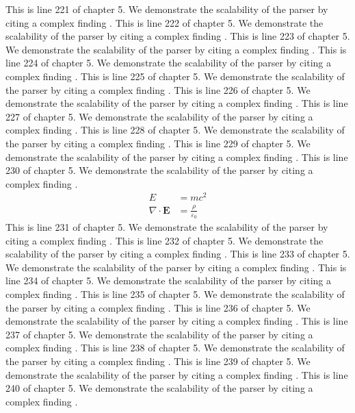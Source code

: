 This is line 221 of chapter 5. We demonstrate the scalability of the parser by citing a complex finding \cite{ref5_221}.
This is line 222 of chapter 5. We demonstrate the scalability of the parser by citing a complex finding \cite{ref5_222}.
This is line 223 of chapter 5. We demonstrate the scalability of the parser by citing a complex finding \cite{ref5_223}.
This is line 224 of chapter 5. We demonstrate the scalability of the parser by citing a complex finding \cite{ref5_224}.
This is line 225 of chapter 5. We demonstrate the scalability of the parser by citing a complex finding \cite{ref5_225}.
This is line 226 of chapter 5. We demonstrate the scalability of the parser by citing a complex finding \cite{ref5_226}.
This is line 227 of chapter 5. We demonstrate the scalability of the parser by citing a complex finding \cite{ref5_227}.
This is line 228 of chapter 5. We demonstrate the scalability of the parser by citing a complex finding \cite{ref5_228}.
This is line 229 of chapter 5. We demonstrate the scalability of the parser by citing a complex finding \cite{ref5_229}.
This is line 230 of chapter 5. We demonstrate the scalability of the parser by citing a complex finding \cite{ref5_230}.
\begin{align*}
  E &= mc^2 \\
  \nabla \cdot \mathbf{E} &= \frac{\rho}{\varepsilon_0}
\end{align*}
This is line 231 of chapter 5. We demonstrate the scalability of the parser by citing a complex finding \cite{ref5_231}.
This is line 232 of chapter 5. We demonstrate the scalability of the parser by citing a complex finding \cite{ref5_232}.
This is line 233 of chapter 5. We demonstrate the scalability of the parser by citing a complex finding \cite{ref5_233}.
This is line 234 of chapter 5. We demonstrate the scalability of the parser by citing a complex finding \cite{ref5_234}.
This is line 235 of chapter 5. We demonstrate the scalability of the parser by citing a complex finding \cite{ref5_235}.
This is line 236 of chapter 5. We demonstrate the scalability of the parser by citing a complex finding \cite{ref5_236}.
This is line 237 of chapter 5. We demonstrate the scalability of the parser by citing a complex finding \cite{ref5_237}.
This is line 238 of chapter 5. We demonstrate the scalability of the parser by citing a complex finding \cite{ref5_238}.
This is line 239 of chapter 5. We demonstrate the scalability of the parser by citing a complex finding \cite{ref5_239}.
This is line 240 of chapter 5. We demonstrate the scalability of the parser by citing a complex finding \cite{ref5_240}.
